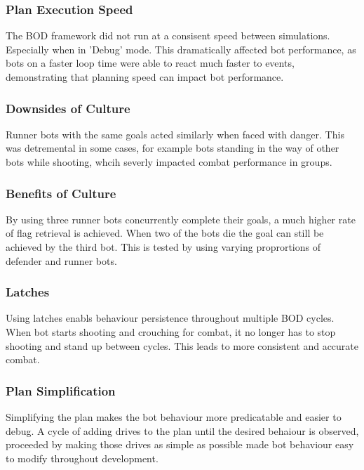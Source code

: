 \documentclass[a4paper,12pt,twocolumn]{report}
\begin{document}
\subsubsection{Plan Execution Speed}
The BOD framework did not run at a consisent speed between simulations. Especially when in 'Debug' mode. This dramatically affected bot performance, as bots on a faster loop time were able to react much faster to events, demonstrating that planning speed can impact bot performance.

\subsubsection{Downsides of Culture}
Runner bots with the same goals acted similarly when faced with danger. This was detremental in some cases, for example bots standing in the way of other bots while shooting, whcih severly impacted combat performance in groups.

\subsubsection{Benefits of Culture}
By using three runner bots concurrently complete their goals, a much higher rate of flag retrieval is achieved. When two of the bots die the goal can still be achieved by the third bot. This is tested by using varying proprortions of defender and runner bots.

\subsubsection{Latches}
Using latches enabls behaviour persistence throughout multiple BOD cycles. When bot starts shooting and crouching for combat, it no longer has to stop shooting and stand up between cycles. This leads to more consistent and accurate combat.

\subsubsection{Plan Simplification}
Simplifying the plan makes the bot behaviour more predicatable and easier to debug. A cycle of adding drives to the plan until the desired behaiour is observed, proceeded by making those drives as simple as possible made bot behaviour easy to modify throughout development.
\end{document}
